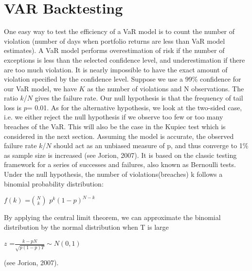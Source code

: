\documentclass[a4paper,11pt,oneside]{book}
\begin{document}
\section{VAR Backtesting}\label{vio}
One easy way to test the efficiency of a VaR model is to count the number of violation (number of days when portfolio returns are less than VaR model estimates). A VaR model performs overestimation of risk if the number of exceptions is less than the selected confidence level, and underestimation if there are too much violation. It is nearly impossible to have the exact amount of violation specified by the confidence level.\newline\newline
Suppose we use a 99\% confidence for our VaR model, we have $K$ as the number of violations and N observations. The ratio $k$/$N$ gives the failure rate. Our null hypothesis is that the frequency of tail loss is $p$= 0.01. As for the alternative hypothesis, we look at the two-sided case, i.e. we either reject the null hypothesis if we observe too few or too many breaches of the VaR. This will also be the case in the Kupiec test which is considered in the next section.  Assuming the model is accurate, the observed failure rate $k$/$N$
should act as an unbiased measure of p, and thus converge to 1\% as sample size is
increased (see Jorion, 2007). \newline\newline
It is based on the classic testing framework for a series of successes and failures, also known as Bernoulli tests. Under the null hypothesis, the number of violations(breaches) k follows a binomial probability distribution:
\begin{center}
	$f(k)$ =$N \choose {k}$ $p^{k}(1-p)^{N-k}$ 
\end{center}

By applying the central limit theorem, we can approximate the binomial distribution by the normal distribution when T is large
\begin{center}
	$z$ =$\frac{k-pN}{\sqrt{p(1-p)T}}\sim N(0,1)$ 
\end{center}
(see Jorion, 2007).
\end{document}
